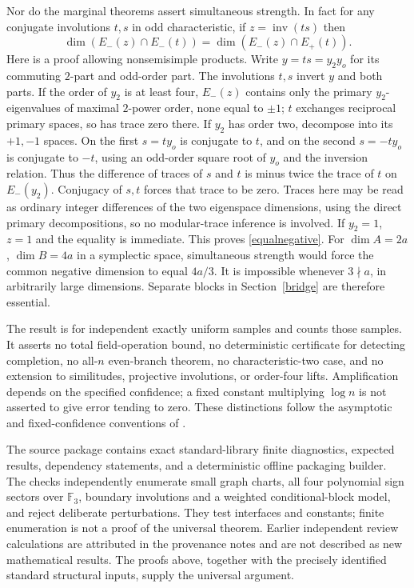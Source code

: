 \documentclass[11pt]{article}
\newcommand{\F}{\mathbb F}
\newcommand{\inv}{\operatorname{inv}}
\begin{document}
Nor do the marginal theorems assert simultaneous strength. In fact for any conjugate involutions $t,s$ in odd characteristic, if $z=\inv(ts)$ then
\begin{equation}\label{equalnegative}
\dim(E_-(z)\cap E_-(t))=\dim(E_-(z)\cap E_+(t)).
\end{equation}
Here is a proof allowing nonsemisimple products. Write $y=ts=y_2y_o$ for its commuting $2$-part and odd-order part. The involutions $t,s$ invert $y$ and both parts. If the order of $y_2$ is at least four, $E_-(z)$ contains only the primary $y_2$-eigenvalues of maximal $2$-power order, none equal to $\pm1$; $t$ exchanges reciprocal primary spaces, so has trace zero there. If $y_2$ has order two, decompose into its $+1,-1$ spaces. On the first $s=ty_o$ is conjugate to $t$, and on the second $s=-ty_o$ is conjugate to $-t$, using an odd-order square root of $y_o$ and the inversion relation. Thus the difference of traces of $s$ and $t$ is minus twice the trace of $t$ on $E_-(y_2)$. Conjugacy of $s,t$ forces that trace to be zero. Traces here may be read as ordinary integer differences of the two eigenspace dimensions, using the direct primary decompositions, so no modular-trace inference is involved. If $y_2=1$, $z=1$ and the equality is immediate. This proves \eqref{equalnegative}. For $\dim A=2a$, $\dim B=4a$ in a symplectic space, simultaneous strength would force the common negative dimension to equal $4a/3$. It is impossible whenever $3\nmid a$, in arbitrarily large dimensions. Separate blocks in Section~\ref{bridge} are therefore essential.

The result is for independent exactly uniform samples and counts those samples. It asserts no total field-operation bound, no deterministic certificate for detecting completion, no all-$n$ even-branch theorem, no characteristic-two case, and no extension to similitudes, projective involutions, or order-four lifts. Amplification depends on the specified confidence; a fixed constant multiplying $\log n$ is not asserted to give error tending to zero. These distinctions follow the asymptotic and fixed-confidence conventions of \cite[Section~2.1]{lgo}.

The source package contains exact standard-library finite diagnostics, expected results, dependency statements, and a deterministic offline packaging builder. The checks independently enumerate small graph charts, all four polynomial sign sectors over $\F_3$, boundary involutions and a weighted conditional-block model, and reject deliberate perturbations. They test interfaces and constants; finite enumeration is not a proof of the universal theorem. Earlier independent review calculations are attributed in the provenance notes and are not described as new mathematical results. The proofs above, together with the precisely identified standard structural inputs, supply the universal argument.
\end{document}
